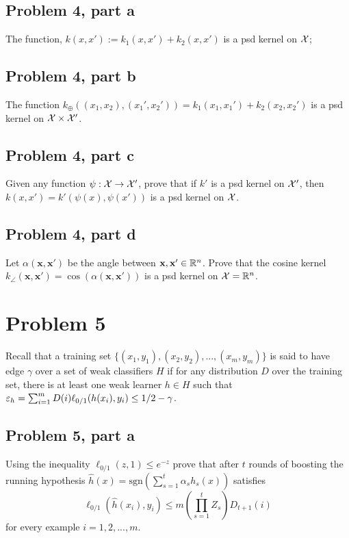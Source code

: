 \subsection{Problem 4, part a}
The function, $k(x, x') := k_1(x, x') + k_2(x, x')$ is a psd kernel on $\mathcal{X}$;

\subsection{Problem 4, part b}
The function $k_\oplus ((x_1, x_2), (x_1', x_2')) = k_1(x_1, x_1') + k_2(x_2, x_2')$ is a psd kernel on $\mathcal{X} \times \mathcal{X}'$.

\subsection{Problem 4, part c}
Given any function $\psi: \mathcal{X} \to \mathcal{X}'$, prove that if $k'$ is a psd kernel on $\mathcal{X}'$, then $k(x, x') = k'(\psi(x), \psi(x'))$ is a psd kernel on $\mathcal{X}$.

\subsection{Problem 4, part d}
Let $\alpha(\textbf{x}, \textbf{x}')$ be the angle between $\textbf{x}, \textbf{x}' \in \mathbb{R}^n$. Prove that the cosine kernel $k_\angle (\textbf{x}, \textbf{x}') = \cos(\alpha(\textbf{x}, \textbf{x}'))$ is a psd kernel on $\mathcal{X} = \mathbb{R}^n$.

\newcommand{\sgn}{\text{sgn}}
\newcommand{\scE}{\mathcal{E}}

\newpage
\section{Problem 5}
Recall that a training set $\{(x_1, y_1), (x_2, y_2), ..., (x_m, y_m)\}$ is said to have edge $\gamma$ over a set of weak classifiers $H$ if for any distribution $D$ over the training set, there is at least one weak learner $h \in H$ such that $\varepsilon_h = \sum_{i = 1}^m D(i)\ell_{0/1}(h(x_i), y_i) \leq 1/2 - \gamma$.

\subsection{Problem 5, part a}
Using the inequality $\ell_{0/1}(z, 1) \leq e^{-z}$ prove that after $t$ rounds of boosting the running hypothesis $\hat{h}(x) = \sgn \left(\sum_{s = 1}^t \alpha_s h_s(x)\right)$ satisfies
\[\ell_{0/1} (\hat{h}(x_i), y_i) \leq m\left(\prod_{s = 1}^t Z_s\right) D_{t+1}(i)\]
for every example $i = 1, 2, ..., m$.

